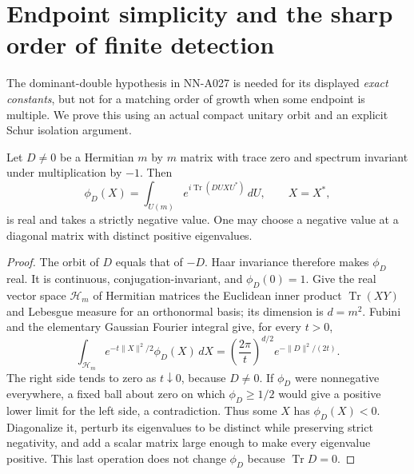 \section{Endpoint simplicity and the sharp order of finite detection}
\label{sec:analytic-multiplicity-detection-equivalence}

The dominant-double hypothesis in NN-A027 is needed for its displayed
\emph{exact constants}, but not for a matching order of growth when
some endpoint is multiple. We prove this using an actual compact
unitary orbit and an explicit Schur isolation argument.

\begin{lemma}
\label{lem:analytic-negative-orbital}
Let $D\ne0$ be a Hermitian $m$ by $m$ matrix with trace zero and
spectrum invariant under multiplication by $-1$. Then
\[
 \phi_D(X)=\int_{U(m)}e^{i\operatorname{Tr}(DUXU^*)}\,dU,
                           \qquad X=X^*,
\]
is real and takes a strictly negative value. One may choose a
negative value at a diagonal matrix with distinct positive eigenvalues.
\end{lemma}

\begin{proof}
The orbit of $D$ equals that of $-D$. Haar invariance therefore makes
$\phi_D$ real. It is continuous, conjugation-invariant, and
$\phi_D(0)=1$. Give the real vector space $\mathcal H_m$ of Hermitian
matrices the Euclidean inner product $\operatorname{Tr}(XY)$ and
Lebesgue measure for an orthonormal basis; its dimension is $d=m^2$.
Fubini and the elementary Gaussian Fourier integral give, for every
$t>0$,
\begin{equation}\label{eq:analytic-orbital-Gaussian}
 \int_{\mathcal H_m}e^{-t\|X\|^2/2}\phi_D(X)\,dX
       =\left(\frac{2\pi}{t}\right)^{d/2}
                         e^{-\|D\|^2/(2t)}.
\end{equation}
The right side tends to zero as $t\downarrow0$, because $D\ne0$.
If $\phi_D$ were nonnegative everywhere, a fixed ball about zero on
which $\phi_D\ge1/2$ would give a positive lower limit for the left
side, a contradiction. Thus some $X$ has $\phi_D(X)<0$.
Diagonalize it, perturb its eigenvalues to be distinct while preserving
strict negativity, and add a scalar matrix large enough to make every
eigenvalue positive. This last operation does not change $\phi_D$
because $\operatorname{Tr}D=0$.
\end{proof}

